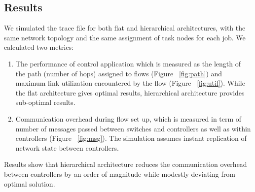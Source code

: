 \documentclass[10pt, twocolumn]{article}
\begin{document}
\subsection{Results}
\label{subsec:results}
We simulated the trace file for both flat and hierarchical architectures, with the same network topology and the same assignment of task nodes for each job. We calculated two metrics:
\begin{enumerate}
    \item The performance of control application which is measured as the length of the path (number of hops) assigned to flows (Figure ~\ref{fig:path}) and maximum link utilization encountered by the flow (Figure ~\ref{fig:util}). While the flat architecture gives optimal results, hierarchical architecture provides sub-optimal results.
    \item Communication overhead during flow set up, which is measured in term of number of messages passed between switches and controllers as well as within controllers (Figure ~\ref{fig:msg}). The simulation assumes instant replication of network state between controllers.
\end{enumerate}
Results show that hierarchical architecture reduces the communication overhead between controllers by an order of magnitude while modestly deviating from optimal solution.
\end{document}
